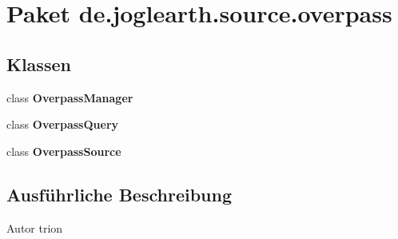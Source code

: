 \section{Paket de.\-joglearth.\-source.\-overpass}
\label{namespacede_1_1joglearth_1_1source_1_1overpass}
\subsection*{Klassen}
\begin{DoxyCompactItemize}
\item 
class {\bf Overpass\-Manager}
\item 
class {\bf Overpass\-Query}
\item 
class {\bf Overpass\-Source}
\end{DoxyCompactItemize}


\subsection{Ausführliche Beschreibung}
\begin{DoxyAuthor}{Autor}
trion 
\end{DoxyAuthor}
